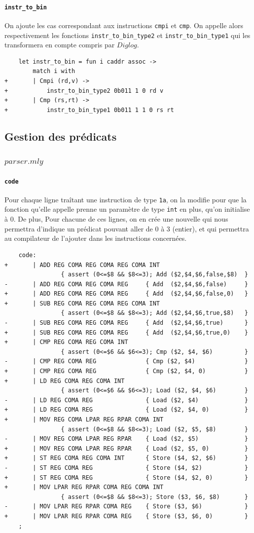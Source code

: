 \documentclass[11pt, a4paper, twoside, titlepage]{article}
\begin{document}
\paragraph{\texttt{instr\_to\_bin}}
On ajoute les cas correspondant aux instructions \texttt{cmpi} et \texttt{cmp}. On appelle alors respectivement les fonctions \texttt{instr\_to\_bin\_type2} et \texttt{instr\_to\_bin\_type1} qui les transformera en compte compris par $Diglog$.
\begin{lstlisting}
	let instr_to_bin = fun i caddr assoc ->
		match i with
+		| Cmpi (rd,v) ->
+			instr_to_bin_type2 0b011 1 0 rd v
+		| Cmp (rs,rt) ->
+			instr_to_bin_type1 0b011 1 1 0 rs rt
\end{lstlisting}

\subsection{Gestion des prédicats}

\subsubsection{$parser.mly$}
\paragraph{\texttt{code}}
Pour chaque ligne traîtant une instruction de type \texttt{1a}, on la modifie pour que la fonction qu'elle appelle prenne un paramètre de type \texttt{int} en plus, qu'on initialise à 0. De plus, Pour chacune de ces lignes, on en crée une nouvelle qui nous permettra d'indique un prédicat pouvant aller de 0 à 3 (entier), et qui permettra au compilateur de l'ajouter dans les instructions concernées.
\begin{lstlisting}
	code:
+		| ADD REG COMA REG COMA REG COMA INT
				{ assert (0<=$8 && $8<=3); Add ($2,$4,$6,false,$8)	}
-		| ADD REG COMA REG COMA REG		{ Add  ($2,$4,$6,false)		}
+		| ADD REG COMA REG COMA REG		{ Add  ($2,$4,$6,false,0)	}
+		| SUB REG COMA REG COMA REG COMA INT
				{ assert (0<=$8 && $8<=3); Add ($2,$4,$6,true,$8)	}
-		| SUB REG COMA REG COMA REG		{ Add  ($2,$4,$6,true)		}
+		| SUB REG COMA REG COMA REG		{ Add  ($2,$4,$6,true,0)	}
+		| CMP REG COMA REG COMA INT
				{ assert (0<=$6 && $6<=3); Cmp ($2, $4, $6)			}
-		| CMP REG COMA REG				{ Cmp ($2, $4)				}
+		| CMP REG COMA REG				{ Cmp ($2, $4, 0)			}
+		| LD REG COMA REG COMA INT
				{ assert (0<=$6 && $6<=3); Load ($2, $4, $6)		}
-		| LD REG COMA REG				{ Load ($2, $4)				}
+		| LD REG COMA REG				{ Load ($2, $4, 0)			}
+		| MOV REG COMA LPAR REG RPAR COMA INT
				{ assert (0<=$8 && $8<=3); Load ($2, $5, $8)		}
-		| MOV REG COMA LPAR REG RPAR	{ Load ($2, $5)				}
+		| MOV REG COMA LPAR REG RPAR	{ Load ($2, $5, 0)			}
+		| ST REG COMA REG COMA INT		{ Store ($4, $2, $6)		}
-		| ST REG COMA REG				{ Store ($4, $2)			}
+		| ST REG COMA REG				{ Store ($4, $2, 0)			}
+		| MOV LPAR REG RPAR COMA REG COMA INT
				{ assert (0<=$8 && $8<=3); Store ($3, $6, $8)		}
-		| MOV LPAR REG RPAR COMA REG	{ Store ($3, $6)			}
+		| MOV LPAR REG RPAR COMA REG	{ Store ($3, $6, 0)			}
	;
\end{lstlisting}
\end{document}
